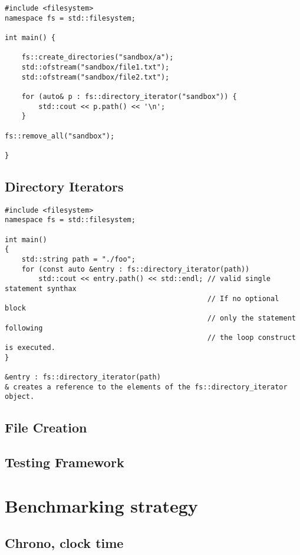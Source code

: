 \begin{verbatim}
#include <filesystem>
namespace fs = std::filesystem;

int main() {

    fs::create_directories("sandbox/a");
    std::ofstream("sandbox/file1.txt");
    std::ofstream("sandbox/file2.txt");

    for (auto& p : fs::directory_iterator("sandbox")) {
        std::cout << p.path() << '\n';
    } 

fs::remove_all("sandbox");

}
\end{verbatim}

\subsection{Directory Iterators}

\begin{verbatim}
#include <filesystem>
namespace fs = std::filesystem;

int main()
{
    std::string path = "./foo";
    for (const auto &entry : fs::directory_iterator(path))
        std::cout << entry.path() << std::endl; // valid single statement synthax
                                                // If no optional block
                                                // only the statement following
                                                // the loop construct is executed.
}

&entry : fs::directory_iterator(path)
& creates a reference to the elements of the fs::directory_iterator object.
\end{verbatim}

\subsection{File Creation}


\subsection{Testing Framework}

\section{Benchmarking strategy}
\subsection{Chrono, clock time}

